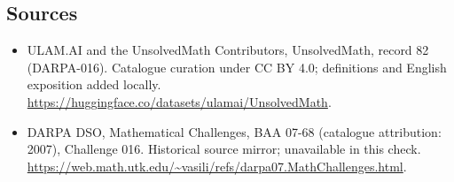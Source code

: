 \documentclass[11pt]{article}
\begin{document}
\subsection{Sources}
\begin{itemize}
\item[\hypertarget{source:82:1}{S1}] ULAM.AI and the UnsolvedMath Contributors, UnsolvedMath, record 82 (DARPA-016). Catalogue curation under CC BY 4.0; definitions and English exposition added locally.
\url{https://huggingface.co/datasets/ulamai/UnsolvedMath}.
\item[\hypertarget{source:82:2}{S2}] DARPA DSO, Mathematical Challenges, BAA 07-68 (catalogue attribution: 2007), Challenge 016. Historical source mirror; unavailable in this check.
\url{https://web.math.utk.edu/~vasili/refs/darpa07.MathChallenges.html}.
\end{itemize}
\label{end:82}
\end{document}
